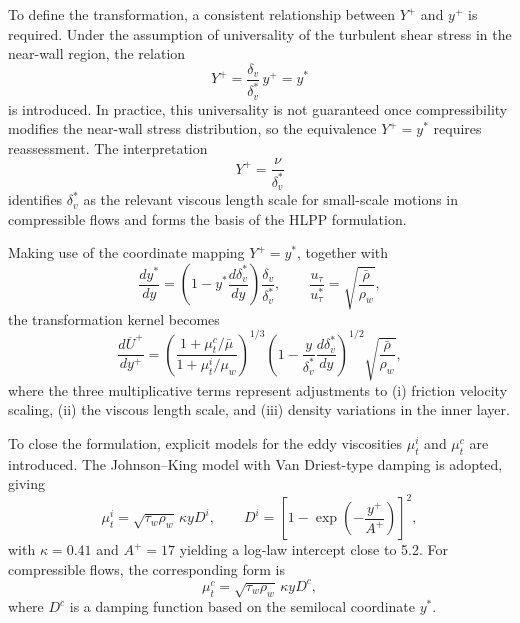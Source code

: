 To define the transformation, a consistent relationship between $Y^{+}$ and $y^{+}$ is required. Under the assumption of universality of the turbulent shear stress in the near-wall region, the relation
\begin{equation}
    Y^{+} = \frac{\delta_{v}}{\delta^{*}_{v}}\, y^{+} = y^{*}
\end{equation}
is introduced. In practice, this universality is not guaranteed once compressibility modifies the near-wall stress distribution, so the equivalence $Y^{+}=y^{*}$ requires reassessment. The interpretation
\begin{equation}
    Y^{+} = \frac{\nu}{\delta^{*}_{v}}
\end{equation}
identifies $\delta^{*}_{v}$ as the relevant viscous length scale for small-scale motions in compressible flows and forms the basis of the HLPP formulation.

Making use of the coordinate mapping $Y^{+}=y^{*}$, together with
\begin{equation}
    \frac{dy^{*}}{dy} = \left(1-y^{*}\frac{d\delta^{*}_{v}}{dy}\right)\frac{\delta_{v}}{\delta^{*}_{v}},
    \qquad
    \frac{u_{\tau}}{u^{*}_{\tau}}=\sqrt{\frac{\bar{\rho}}{\rho_{w}}},
\end{equation}
the transformation kernel becomes
\begin{equation}
\frac{d\overline{U}^{+}}{dy^{+}} = 
\left(\frac{1+\mu^{c}_{t}/\bar{\mu}}{1+\mu^{i}_{t}/\mu_{w}}\right)^{1/3}
\left(1-\frac{y}{\delta^{*}_{v}}\frac{d\delta^{*}_{v}}{dy}\right)^{1/2}
\sqrt{\frac{\bar{\rho}}{\rho_{w}}},
\label{eq:TLkernel}
\end{equation}
where the three multiplicative terms represent adjustments to (i) friction velocity scaling, (ii) the viscous length scale, and (iii) density variations in the inner layer.

To close the formulation, explicit models for the eddy viscosities $\mu^{i}_{t}$ and $\mu^{c}_{t}$ are introduced. The Johnson–King model with Van Driest-type damping is adopted, giving
\begin{equation}
    \mu^{i}_{t}=\sqrt{\tau_{w}\rho_{w}}\,\kappa y D^{i},
    \qquad
    D^{i}=\left[1-\exp\left(-\frac{y^{+}}{A^{+}}\right)\right]^{2},
\end{equation}
with $\kappa=0.41$ and $A^{+}=17$ yielding a log-law intercept close to 5.2. For compressible flows, the corresponding form is
\begin{equation}
    \mu^{c}_{t}=\sqrt{\tau_{w}\rho_{w}}\,\kappa y D^{c},
\end{equation}
where $D^{c}$ is a damping function based on the semilocal coordinate $y^{*}$.

